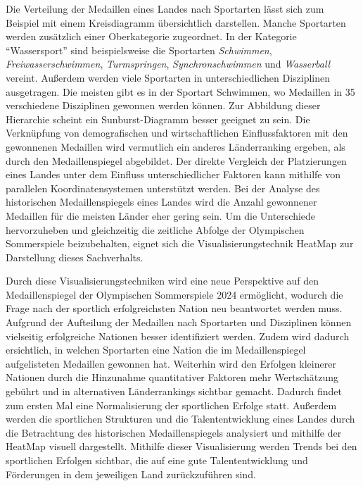 Die Verteilung der Medaillen eines Landes nach Sportarten lässt sich zum Beispiel mit einem Kreisdiagramm übersichtlich darstellen. Manche Sportarten werden zusätzlich einer Oberkategorie zugeordnet. In der Kategorie \enquote{Wassersport} sind beispielsweise die Sportarten \textit{Schwimmen}, \textit{Freiwasserschwimmen}, \textit{Turmspringen}, \textit{Synchronschwimmen} und \textit{Wasserball} vereint. Außerdem werden viele Sportarten in unterschiedlichen Disziplinen ausgetragen. Die meisten gibt es in der Sportart Schwimmen, wo Medaillen in 35 verschiedene Disziplinen gewonnen werden können. Zur Abbildung dieser Hierarchie scheint ein Sunburst-Diagramm besser geeignet zu sein. Die Verknüpfung von demografischen und wirtschaftlichen Einflussfaktoren mit den gewonnenen Medaillen wird vermutlich ein anderes Länderranking ergeben, als durch den Medaillenspiegel abgebildet. Der direkte Vergleich der Platzierungen eines Landes unter dem Einfluss unterschiedlicher Faktoren kann mithilfe von parallelen Koordinatensystemen unterstützt werden. Bei der Analyse des historischen Medaillenspiegels eines Landes wird die Anzahl gewonnener Medaillen für die meisten Länder eher gering sein. Um die Unterschiede hervorzuheben und gleichzeitig die zeitliche Abfolge der Olympischen Sommerspiele beizubehalten, eignet sich die Visualisierungstechnik HeatMap zur Darstellung dieses Sachverhalts.

Durch diese Visualisierungstechniken wird eine neue Perspektive auf den Medaillenspiegel der Olympischen Sommerspiele 2024 ermöglicht, wodurch die Frage nach der sportlich erfolgreichsten Nation neu beantwortet werden muss. Aufgrund der Aufteilung der Medaillen nach Sportarten und Disziplinen können vielseitig erfolgreiche Nationen besser identifiziert werden. Zudem wird dadurch ersichtlich, in welchen Sportarten eine Nation die im Medaillenspiegel aufgelisteten Medaillen gewonnen hat. Weiterhin wird den Erfolgen kleinerer Nationen durch die Hinzunahme quantitativer Faktoren mehr Wertschätzung gebührt und in alternativen Länderrankings sichtbar gemacht. Dadurch findet zum ersten Mal eine Normalisierung der sportlichen Erfolge statt. Außerdem werden die sportlichen Strukturen und die Talententwicklung eines Landes durch die Betrachtung des historischen Medaillenspiegels analysiert und mithilfe der HeatMap visuell dargestellt. Mithilfe dieser Visualisierung werden Trends bei den sportlichen Erfolgen sichtbar, die auf eine gute Talententwicklung und Förderungen in dem jeweiligen Land zurückzuführen sind.